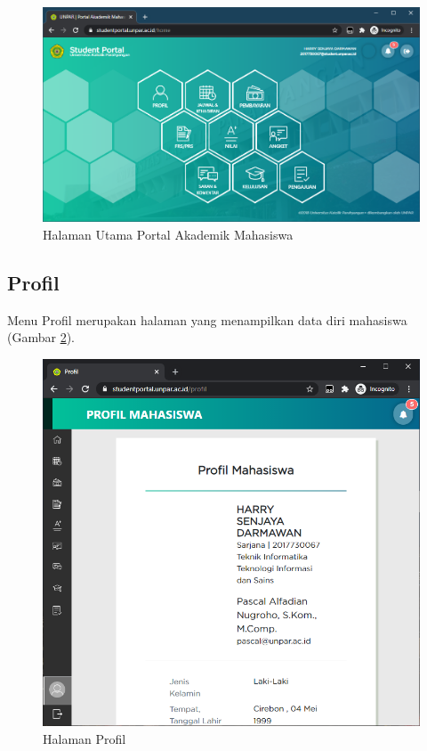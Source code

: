 \begin{figure}[H]
	\centering
	\includegraphics[scale=0.5]{Gambar/home.png}
	\caption{Halaman Utama Portal Akademik Mahasiswa} 
	\label{fig:3_home}
\end{figure}


\subsection{Profil}
    Menu Profil merupakan halaman yang menampilkan data diri mahasiswa (Gambar \ref{fig:3_profil}). 
    \begin{figure}[H]
    	\centering
    	\includegraphics[scale=0.45]{Gambar/profil.png}
    	\caption{Halaman Profil} 
    	\label{fig:3_profil}
    \end{figure}

